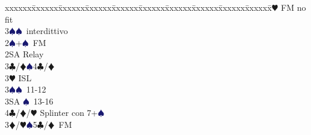 \documentclass[a4paper,italian]{article}
\newcommand{\BC}{\textcolor{OliveGreen}{$\clubsuit$}}
\newcommand{\BD}{\textcolor{RedOrange}{$\vardiamondsuit$}}
\newcommand{\BH}{\textcolor{Red2}{$\varheartsuit${}}}
\newcommand{\BS}{\textcolor{MidnightBlue}{$\spadesuit${}}}
\newenvironment{bidtable}
{\begin{tabbing}

    xxxxxx\=xxxxxx\=xxxxxx\=xxxxxx\=xxxxxx\=xxxxxx\=xxxxxx\=xxxxxx\=xxxxxx\=xxxxxx\=\kill}
{\end{tabbing} }%
\begin{document}
\begin{multicols*}{2}
\begin{bidtable}
                                            3\BH \> FM no fit\\
                                            3\BS {}\BS\ interdittivo\-\\
                                            2\BS {}+\BS\ FM\+\\
                                            2SA \> Relay\+\\
                                            3\BC/\BD {}\BS 4\BC /\BD \\
                                            3\BH \> ISL\\
                                            3\BS {}\BS\ 11-12\\
                                            3SA \BS\ 13-16\\
                                            4\BC/\BD/\BH \> Splinter con 7+\BS \-\-\\
                                            3\BD/\BH {}\BS 5\BC /\BD\ FM
                                        \end{bidtable}

                                        \vfill
                                        \parbox{\textwidth}{}

                                        \columnbreak


\end{multicols*}
\end{document}
